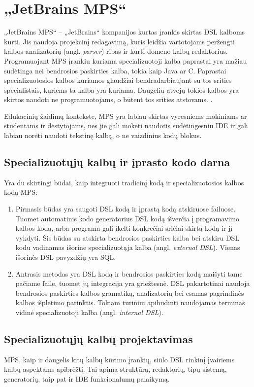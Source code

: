\documentclass{VUMIFPSkursinis}
\begin{document}
\section{„JetBrains MPS“}

„JetBrains MPS“ -- „JetBrains“ kompanijos kurtas įrankis skirtas DSL kalboms kurti. Jis naudoja projekcinį redagavimą, kuris leidžia vartotojams peržengti kalbos analizatorių (angl. \textit{parser}) ribas ir kurti domeno kalbų redaktorius. 
Programuojant MPS įrankiu kuriama specializuotoji kalba paprastai yra mažiau sudėtinga nei bendrosios paskirties kalba, tokia kaip Java ar C. Paprastai specializuotosios kalbos kuriamos glaudžiai bendradarbiaujant su tos srities specialistais, kuriems ta kalba yra kuriama. Daugeliu atvejų tokios kalbos yra skirtos naudoti ne programuotojams, o būtent tos srities atstovams. \cite{JetBrainsMPS}.

Edukacinių žaidimų kontekste, MPS yra labiau skirtas vyresniems mokiniams ar studentams ir dėstytojams, nes jie gali mokėti naudotis sudėtingesniu IDE ir gali labiau norėti naudoti tekstinę kalbą, o ne vaizdinius kodų blokus.

\subsection{Specializuotųjų kalbų ir įprasto kodo darna}
Yra du skirtingi būdai, kaip integruoti tradicinį kodą ir specializuotosios kalbos kodą MPS:
\begin{enumerate}
\item Pirmasis būdas yra saugoti DSL kodą ir įprastą kodą atskiruose failuose. Tuomet automatinis kodo generatorius DSL kodą išverčia į programavimo kalbos kodą, arba programa gali įkelti konkrečiai sričiai skirtą kodą ir jį vykdyti. Šis būdas su atskirta bendrosios paskirties kalba bei atskiru DSL kodu vadinamas išorine specializuotąja kalba (angl. \textit{external DSL}). Vienas išorinės DSL pavyzdžių yra SQL.
\item Antrasis metodas yra DSL kodą ir bendrosios paskirties kodą maišyti tame pačiame faile, tuomet jų integracija yra griežtesnė. DSL pakartotinai naudoja bendrosios paskirties kalbos gramatiką, analizatorių bei esamas pagrindinės kalbos išplėtimo parinktis. Tokiam turiniui apibūdinti naudojamas terminas vidinė specializuotoji kalba (angl. \textit{internal DSL}).\cite{JetBrainsMPS}
\end{enumerate}

\subsection{Specializuotųjų kalbų projektavimas}
MPS, kaip ir daugelis kitų kalbų kūrimo įrankių, siūlo DSL rinkinį įvairiems kalbų aspektams apibrėžti. Tai apima struktūrą, redaktorių, tipų sistemą, generatorių, taip pat ir IDE funkcionalumų palaikymą. \cite{10.1145/2500828.2500846}
\end{document}
